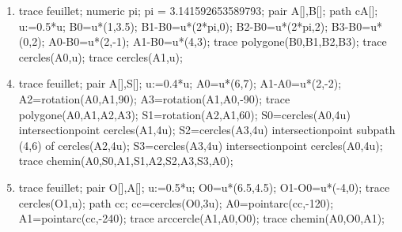 \begin{exercice*}
\begin{minipage}{0.45\linewidth}
\begin{enumerate}
            \pointilles
            \item \phantom{rrr}
            
            \begin{Geometrie}[CoinHD={u*(4.5,4.5)}]
                trace feuillet;
                numeric pi;
                pi = 3.141592653589793;
                pair A[],B[];
                path cA[];
                u:=0.5*u;
                B0=u*(1,3.5);
                B1-B0=u*(2*pi,0);
                B2-B0=u*(2*pi,2);
                B3-B0=u*(0,2);
                A0-B0=u*(2,-1);
                A1-B0=u*(4,3);
                trace polygone(B0,B1,B2,B3);
                trace cercles(A0,u);
                trace cercles(A1,u);
            \end{Geometrie}

            \pointilles
        \end{enumerate}
    \end{minipage}
    \hfill
    \begin{minipage}{0.45\linewidth}        
        \begin{enumerate}
            \setcounter{enumi}{3}
            \item \phantom{rrr}
            
            \begin{Geometrie}[CoinHD={u*(4.5,4.5)}]
                trace feuillet;
                pair A[],S[];
                u:=0.4*u;
                A0=u*(6,7);                
                A1-A0=u*(2,-2);
                A2=rotation(A0,A1,90);
                A3=rotation(A1,A0,-90);
                trace polygone(A0,A1,A2,A3);                
                S1=rotation(A2,A1,60);
                S0=cercles(A0,4u) intersectionpoint cercles(A1,4u);
                S2=cercles(A3,4u) intersectionpoint subpath (4,6) of cercles(A2,4u);
                S3=cercles(A3,4u) intersectionpoint cercles(A0,4u);
                trace chemin(A0,S0,A1,S1,A2,S2,A3,S3,A0);
            \end{Geometrie}
            
            \pointilles
            \item \phantom{rrr}
            
            \begin{Geometrie}[CoinHD={u*(4.5,4.5)}]
                trace feuillet;
                pair O[],A[];
                u:=0.5*u;
                O0=u*(6.5,4.5);
                O1-O0=u*(-4,0);
                trace cercles(O1,u);
                path cc;
                cc=cercles(O0,3u);
                A0=pointarc(cc,-120);
                A1=pointarc(cc,-240);
                trace arccercle(A1,A0,O0);
                trace chemin(A0,O0,A1);
            \end{Geometrie}


\end{enumerate}
\end{minipage}
\end{exercice*}
